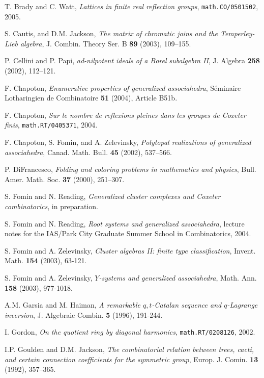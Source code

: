 \documentclass[12pt,letterpaper, reqno]{aimpl}
\begin{document}
\begin{thebibliography}{99}
T. Brady and C. Watt, \emph{Lattices in finite real reflection groups}, \texttt{math.CO/0501502}, 2005.

S. Cautis, and D.M. Jackson, \emph{The matrix of chromatic joins and the Temperley-Lieb algebra}, J. Combin. Theory Ser. B {\bf 89} (2003), 109--155.

P. Cellini and P. Papi, \emph{ad-nilpotent ideals of a Borel subalgebra II}, J. Algebra {\bf 258} (2002), 112--121.

F. Chapoton, \emph{Enumerative properties of generalized associahedra}, S\'eminaire Lotharingien de Combinatoire {\bf 51} (2004), Article B51b.

F. Chapoton, \emph{Sur le nombre de reflexions pleines dans les groupes de Coxeter finis}, \texttt{math.RT/0405371}, 2004.

F. Chapoton, S. Fomin, and A. Zelevinsky, \emph{Polytopal realizations of generalized associahedra}, Canad. Math. Bull. {\bf 45} (2002), 537--566.

P.  DiFrancesco, \emph{Folding and coloring problems in mathematics and physics}, Bull.  Amer. Math. Soc. {\bf 37} (2000), 251--307.

S. Fomin and N. Reading, \emph{Generalized cluster complexes and Coxeter combinatorics}, in preparation.

S. Fomin and N. Reading, \emph{Root systems and generalized associahedra}, lecture notes for the IAS/Park City Graduate Summer School in Combinatorics, 2004.

S. Fomin and A. Zelevinsky, \emph{Cluster algebras II: finite type classification}, Invent. Math. {\bf 154} (2003), 63-121.

S. Fomin and A. Zelevinsky, \emph{$Y$-systems and generalized associahedra}, Math. Ann. {\bf 158} (2003), 977-1018.

A.M. Garsia and M. Haiman, \emph{A remarkable $q,t$-Catalan sequence and $q$-Lagrange inversion}, J. Algebraic Combin. {\bf 5} (1996), 191-244.

I. Gordon, \emph{On the quotient ring by diagonal harmonics}, \texttt{math.RT/0208126}, 2002.

I.P. Goulden and D.M. Jackson, \emph{The combinatorial relation between trees, cacti, and certain connection coefficients for the symmetric group}, Europ. J. Comin. {\bf 13} (1992), 357--365.


\end{thebibliography}
\end{document}
